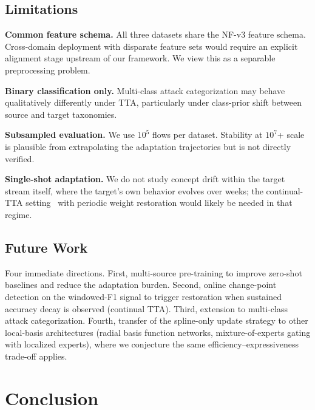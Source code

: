 \documentclass[10pt, conference, letterpaper]{IEEEtran}
\begin{document}
\subsection{Limitations}

\textbf{Common feature schema.} All three datasets share the NF-v3 feature schema. Cross-domain deployment with disparate feature sets would require an explicit alignment stage upstream of our framework. We view this as a separable preprocessing problem.

\textbf{Binary classification only.} Multi-class attack categorization may behave qualitatively differently under TTA, particularly under class-prior shift between source and target taxonomies.

\textbf{Subsampled evaluation.} We use $10^5$ flows per dataset. Stability at $10^7$+ scale is plausible from extrapolating the adaptation trajectories but is not directly verified.

\textbf{Single-shot adaptation.} We do not study concept drift within the target stream itself, where the target's own behavior evolves over weeks; the continual-TTA setting~\cite{wang2022cotta} with periodic weight restoration would likely be needed in that regime.

\subsection{Future Work}

Four immediate directions. First, multi-source pre-training to improve zero-shot baselines and reduce the adaptation burden. Second, online change-point detection on the windowed-F1 signal to trigger restoration when sustained accuracy decay is observed (continual TTA). Third, extension to multi-class attack categorization. Fourth, transfer of the spline-only update strategy to other local-basis architectures (radial basis function networks, mixture-of-experts gating with localized experts), where we conjecture the same efficiency--expressiveness trade-off applies.


\section{Conclusion}
\label{sec:conclusion}
\end{document}
